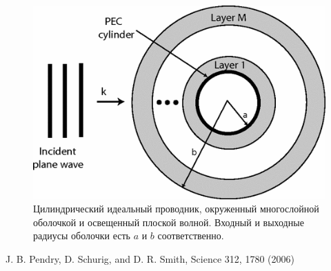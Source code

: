 \documentclass[a4paper, 12pt]{article}
\begin{document}
\begin{figure}[t]
  \centering
  \includegraphics[height=0.25\paperheight, width=0.55\paperwidth]{fig1.png}
  \caption{Цилиндрический идеальный проводник, окруженный многослойной оболочкой
  и освещенный плоской волной. Входный и выходные радиусы оболочки есть 
  $a$ и $b$ соответственно.}
  \label{fig:1}
\end{figure}

\begin{thebibliography}{99}
J. B. Pendry, D. Schurig, and D. R. Smith, Science 312, 1780 (2006)
\end{thebibliography}
\end{document}
